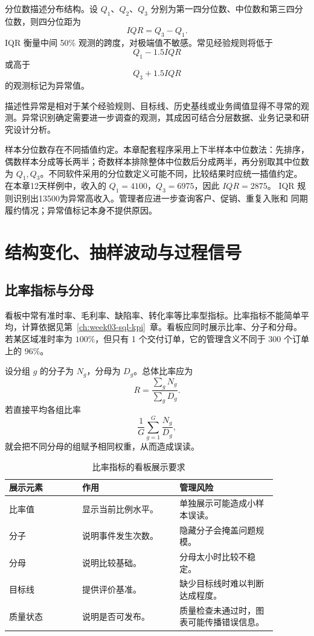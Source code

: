 分位数描述分布结构。设 \(Q_1\)、\(Q_2\)、\(Q_3\) 分别为第一四分位数、中位数和第三四分位数，则四分位距为
\[
IQR=Q_3-Q_1.
\]
IQR 衡量中间 50\% 观测的跨度，对极端值不敏感。常见经验规则将低于
\[
Q_1-1.5IQR
\]
或高于
\[
Q_3+1.5IQR
\]
的观测标记为异常值。

\begin{definition}[描述性异常]
描述性异常是相对于某个经验规则、目标线、历史基线或业务阈值显得不寻常的观测。异常识别确定需要进一步调查的观测，其成因可结合分层数据、业务记录和研究设计分析。
\end{definition}

样本分位数存在不同插值约定。本章配套程序采用上下半样本中位数法：先排序，
偶数样本分成等长两半；奇数样本排除整体中位数后分成两半，再分别取其中位数为
\(Q_1,Q_3\)。不同软件采用的分位数定义可能不同，比较结果时应统一插值约定。
在本章12天样例中，收入的 \(Q_1=4100\)，\(Q_3=6975\)，因此 \(IQR=2875\)。
IQR 规则识别出13500为异常高收入。管理者应进一步查询客户、促销、重复入账和
同期履约情况；异常值标记本身不提供原因。

\section{结构变化、抽样波动与过程信号}
\subsection{比率指标与分母}

看板中常有准时率、毛利率、缺陷率、转化率等比率型指标。比率指标不能简单平均，计算依据见第~\ref{ch:week03-sql-kpi}~章。看板应同时展示比率、分子和分母。若某区域准时率为 \(100\%\)，但只有 1 个交付订单，它的管理含义不同于 300 个订单上的 \(96\%\)。

设分组 \(g\) 的分子为 \(N_g\)，分母为 \(D_g\)。总体比率应为
\[
R=\frac{\sum_g N_g}{\sum_g D_g}.
\]
若直接平均各组比率
\[
\frac{1}{G}\sum_{g=1}^G \frac{N_g}{D_g},
\]
就会把不同分母的组赋予相同权重，从而造成误读。

\begin{table}[htbp]
\centering
\caption{比率指标的看板展示要求}
\begin{tabular}{P{0.24\linewidth}P{0.32\linewidth}P{0.32\linewidth}}
\toprule
{}
展示元素 & 作用 & 管理风险\\
\midrule

比率值 & 显示当前比例水平。 & 单独展示可能造成小样本误读。\\
分子 & 说明事件发生次数。 & 隐藏分子会掩盖问题规模。\\
分母 & 说明比较基础。 & 分母太小时比较不稳定。\\
目标线 & 提供评价基准。 & 缺少目标线时难以判断达成程度。\\
质量状态 & 说明是否可发布。 & 质量检查未通过时，图表可能传播错误信息。\\
\bottomrule
\end{tabular}
\end{table}

